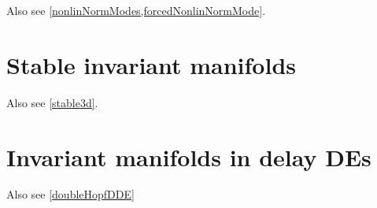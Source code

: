 \documentclass[11pt,a4paper]{refart}
\begin{document}
Also see \cref{nonlinNormModes,forcedNonlinNormMode}.








\section{Stable invariant manifolds}

Also see \cref{stable3d}.




\section{Invariant manifolds in delay DEs}

Also see \cref{doubleHopfDDE}






\end{document}
